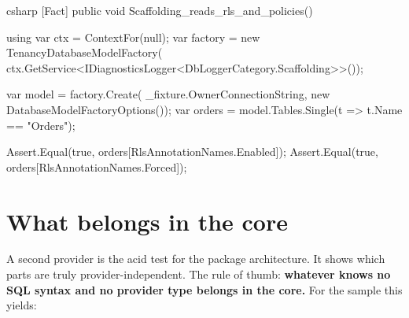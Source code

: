 \begin{sourcecode}{csharp}
[Fact]
public void Scaffolding_reads_rls_and_policies()
{
    using var ctx = ContextFor(null);
    var factory = new TenancyDatabaseModelFactory(
        ctx.GetService<IDiagnosticsLogger<DbLoggerCategory.Scaffolding>>());

    var model = factory.Create(
        _fixture.OwnerConnectionString, new DatabaseModelFactoryOptions());
    var orders = model.Tables.Single(t => t.Name == "Orders");

    Assert.Equal(true, orders[RlsAnnotationNames.Enabled]);
    Assert.Equal(true, orders[RlsAnnotationNames.Forced]);
}
\end{sourcecode}

\chapter{What belongs in the core}\label{ch:what-belongs-in-the-core}

A second provider is the acid test for the package architecture. It shows which parts are
truly provider-independent. The rule of thumb: \textbf{whatever knows no SQL syntax and no
provider type belongs in the core.} For the sample this yields:

